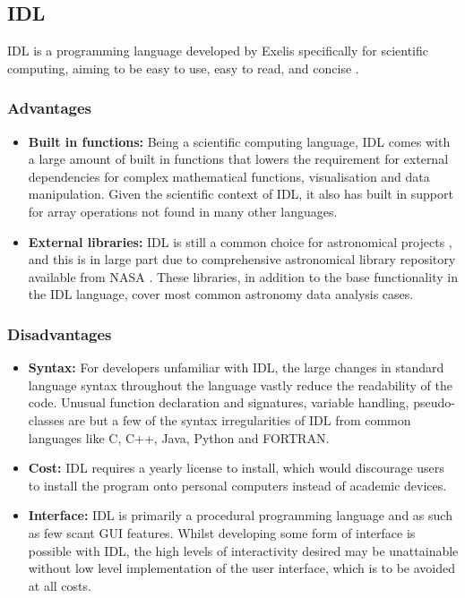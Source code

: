 \documentclass[titlesmallcaps, examinerscopy, copyrightpage]{uqthesis}
\begin{document}
\subsection{IDL}

IDL is a programming language developed by Exelis specifically for scientific computing, aiming to be easy to use, easy to read, and concise \cite{idl}. 

\subsubsection{Advantages}
\begin{itemize}
\item \textbf{Built in functions:} Being a scientific computing language, IDL comes with a large amount of built in functions that lowers the requirement for external dependencies for complex mathematical functions, visualisation and data manipulation. Given the scientific context of IDL, it also has built in support for array operations not found in many other languages.
\item \textbf{External libraries:} IDL is still a common choice for astronomical projects \cite{PythonPop}, and this is in large part due to comprehensive astronomical library repository available from NASA \cite{IDLAstro}. These libraries, in addition to the base functionality in the IDL language, cover most common astronomy data analysis cases.
\end{itemize}
\subsubsection{Disadvantages}
\begin{itemize}
\item \textbf{Syntax:} For developers unfamiliar with IDL, the large changes in standard language syntax throughout the language vastly reduce the readability of the code. Unusual function declaration and signatures, variable handling, pseudo-classes are but a few of the syntax irregularities of IDL from common languages like C, C++, Java, Python and FORTRAN.
\item \textbf{Cost:} IDL requires a yearly license to install, which would discourage users to install the program onto personal computers instead of academic devices.
\item \textbf{Interface:} IDL is primarily a procedural programming language and as such as few scant GUI features. Whilst developing some form of interface is possible with IDL, the high levels of interactivity desired may be unattainable without low level implementation of the user interface, which is to be avoided at all costs.
\end{itemize}
\end{document}
